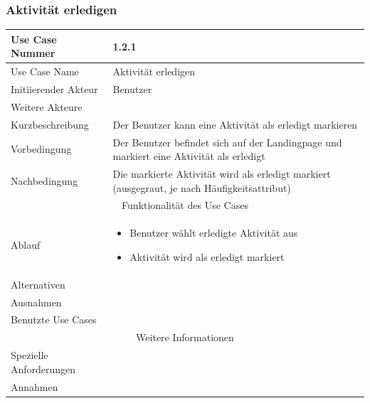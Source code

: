 \documentclass[10pt,a4paper]{article}
\begin{document}
		\subsubsection{Aktivität erledigen}
		\begin{tabularx}{\textwidth}{|l|X|}
			\hline Use Case Nummer & 1.2.1 \\ 
			\hline Use Case Name & Aktivität erledigen \\ 
			\hline Initiierender Akteur & Benutzer \\
			\hline Weitere Akteure & \\
			\hline Kurzbeschreibung & Der Benutzer kann eine Aktivität als erledigt markieren \\
			\hline Vorbedingung & Der Benutzer befindet sich auf der Landingpage und markiert eine Aktivität als erledigt \\
			\hline Nachbedingung & Die markierte Aktivität wird als erledigt markiert (ausgegraut, je nach Häufigkeitsattribut) \\
			\hline \multicolumn{2}{|c|}{Funktionalität des Use Cases}\\
			\hline Ablauf & \begin{itemize}
				\item Benutzer wählt erledigte Aktivität aus
				\item Aktivität wird als erledigt markiert
			\end{itemize} \\
			\hline Alternativen & \\
			\hline Ausnahmen & \\
			\hline Benutzte Use Cases & \\
			\hline \multicolumn{2}{|c|}{Weitere Informationen} \\
			\hline Spezielle Anforderungen & \\
			\hline Annahmen & \\
			\hline
		\end{tabularx}
		
\end{document}
